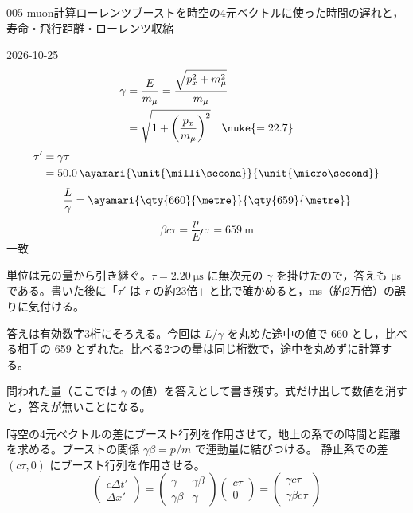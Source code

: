 \documentclass[uplatex,dvipdfmx,a4paper,11pt]{jsarticle}
\begin{document}
\begin{mondai}{005-muon}{計算}{ローレンツブーストを時空の4元ベクトルに使った時間の遅れと，寿命・飛行距離・ローレンツ収縮}
\begin{kotaeutsushi}{2026-10-25}
\begin{align*}
  \gamma&=\frac{E}{m_{\mu}}=\frac{\sqrt{p_{x}^{2}+m_{\mu}^{2}}}{m_{\mu}}\\
  &=\sqrt{1+\left(\frac{p_{x}}{m_{\mu}}\right)^{2}}\quad\nuke{=22.7}
\end{align*}
\begin{align*}
  \tau'&=\gamma\tau\\
  &=50.0\,\ayamari{\unit{\milli\second}}{\unit{\micro\second}}
\end{align*}
\[ \frac{L}{\gamma}=\ayamari{\qty{660}{\metre}}{\qty{659}{\metre}} \]
\[ \beta c\tau=\frac{p}{E}c\tau=\qty{659}{\metre} \]
一致
\end{kotaeutsushi}
\begin{kizuki}
\item 単位は元の量から引き継ぐ。$\tau=\qty{2.20}{\micro\second}$ に無次元の $\gamma$ を掛けたので，答えも \unit{\micro\second} である。書いた後に「$\tau'$ は $\tau$ の約23倍」と比で確かめると，\unit{\milli\second}（約2万倍）の誤りに気付ける。
\item {} 答えは有効数字3桁にそろえる。今回は $L/\gamma$ を丸めた途中の値で 660 とし，比べる相手の 659 とずれた。比べる2つの量は同じ桁数で，途中を丸めずに計算する。
\item {} 問われた量（ここでは $\gamma$ の値）を答えとして書き残す。式だけ出して数値を消すと，答えが無いことになる。
\end{kizuki}
\begin{tadashii}
\houshin 時空の4元ベクトルの差にブースト行列を作用させて，地上の系での時間と距離を求める。ブーストの関係 $\gamma\beta=p/m$ で運動量に結びつける。
\keisan {} 静止系での差 $(c\tau,0)$ にブースト行列を作用させる。
\[ \begin{pmatrix} c\Delta t'\\ \Delta x'\end{pmatrix}=\begin{pmatrix}\gamma&\gamma\beta\\ \gamma\beta&\gamma\end{pmatrix}\begin{pmatrix} c\tau\\ 0\end{pmatrix}=\begin{pmatrix}\gamma c\tau\\ \gamma\beta c\tau\end{pmatrix} \]

\end{tadashii}
\end{mondai}
\end{document}
